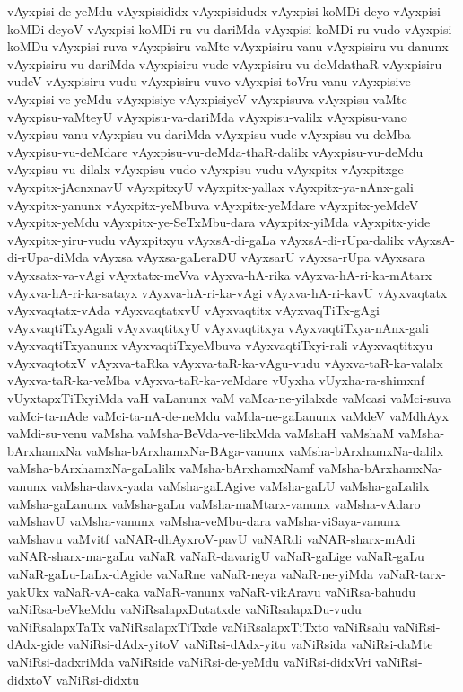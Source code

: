 {vAyxpisi-de-yeMdu
vAyxpisididx
vAyxpisidudx
vAyxpisi-koMDi-deyo
vAyxpisi-koMDi-deyoV
vAyxpisi-koMDi-ru-vu-dariMda
vAyxpisi-koMDi-ru-vudo
vAyxpisi-koMDu
vAyxpisi-ruva
vAyxpisiru-vaMte
vAyxpisiru-vanu
vAyxpisiru-vu-danunx
vAyxpisiru-vu-dariMda
vAyxpisiru-vude
vAyxpisiru-vu-deMdathaR
vAyxpisiru-vudeV
vAyxpisiru-vudu
vAyxpisiru-vuvo
vAyxpisi-toVru-vanu
vAyxpisive
vAyxpisi-ve-yeMdu
vAyxpisiye
vAyxpisiyeV
vAyxpisuva
vAyxpisu-vaMte
vAyxpisu-vaMteyU
vAyxpisu-va-dariMda
vAyxpisu-valilx
vAyxpisu-vano
vAyxpisu-vanu
vAyxpisu-vu-dariMda
vAyxpisu-vude
vAyxpisu-vu-deMba
vAyxpisu-vu-deMdare
vAyxpisu-vu-deMda-thaR-dalilx
vAyxpisu-vu-deMdu
vAyxpisu-vu-dilalx
vAyxpisu-vudo
vAyxpisu-vudu
vAyxpitx
vAyxpitxge
vAyxpitx-jAcnxnavU
vAyxpitxyU
vAyxpitx-yallax
vAyxpitx-ya-nAnx-gali
vAyxpitx-yanunx
vAyxpitx-yeMbuva
vAyxpitx-yeMdare
vAyxpitx-yeMdeV
vAyxpitx-yeMdu
vAyxpitx-ye-SeTxMbu-dara
vAyxpitx-yiMda
vAyxpitx-yide
vAyxpitx-yiru-vudu
vAyxpitxyu
vAyxsA-di-gaLa
vAyxsA-di-rUpa-dalilx
vAyxsA-di-rUpa-diMda
vAyxsa
vAyxsa-gaLeraDU
vAyxsarU
vAyxsa-rUpa
vAyxsara
vAyxsatx-va-vAgi
vAyxtatx-meVva
vAyxva-hA-rika
vAyxva-hA-ri-ka-mAtarx
vAyxva-hA-ri-ka-satayx
vAyxva-hA-ri-ka-vAgi
vAyxva-hA-ri-kavU
vAyxvaqtatx
vAyxvaqtatx-vAda
vAyxvaqtatxvU
vAyxvaqtitx
vAyxvaqTiTx-gAgi
vAyxvaqtiTxyAgali
vAyxvaqtitxyU
vAyxvaqtitxya
vAyxvaqtiTxya-nAnx-gali
vAyxvaqtiTxyanunx
vAyxvaqtiTxyeMbuva
vAyxvaqtiTxyi-rali
vAyxvaqtitxyu
vAyxvaqtotxV
vAyxva-taRka
vAyxva-taR-ka-vAgu-vudu
vAyxva-taR-ka-valalx
vAyxva-taR-ka-veMba
vAyxva-taR-ka-veMdare
vUyxha
vUyxha-ra-shimxnf
vUyxtapxTiTxyiMda
vaH
vaLanunx
vaM
vaMca-ne-yilalxde
vaMcasi
vaMci-suva
vaMci-ta-nAde
vaMci-ta-nA-de-neMdu
vaMda-ne-gaLanunx
vaMdeV
vaMdhAyx
vaMdi-su-venu
vaMsha
vaMsha-BeVda-ve-lilxMda
vaMshaH
vaMshaM
vaMsha-bArxhamxNa
vaMsha-bArxhamxNa-BAga-vanunx
vaMsha-bArxhamxNa-dalilx
vaMsha-bArxhamxNa-gaLalilx
vaMsha-bArxhamxNamf
vaMsha-bArxhamxNa-vanunx
vaMsha-davx-yada
vaMsha-gaLAgive
vaMsha-gaLU
vaMsha-gaLalilx
vaMsha-gaLanunx
vaMsha-gaLu
vaMsha-maMtarx-vanunx
vaMsha-vAdaro
vaMshavU
vaMsha-vanunx
vaMsha-veMbu-dara
vaMsha-viSaya-vanunx
vaMshavu
vaMvitf
vaNAR-dhAyxroV-pavU
vaNARdi
vaNAR-sharx-mAdi
vaNAR-sharx-ma-gaLu
vaNaR
vaNaR-davarigU
vaNaR-gaLige
vaNaR-gaLu
vaNaR-gaLu-LaLx-dAgide
vaNaRne
vaNaR-neya
vaNaR-ne-yiMda
vaNaR-tarx-yakUkx
vaNaR-vA-caka
vaNaR-vanunx
vaNaR-vikAravu
vaNiRsa-bahudu
vaNiRsa-beVkeMdu
vaNiRsalapxDutatxde
vaNiRsalapxDu-vudu
vaNiRsalapxTaTx
vaNiRsalapxTiTxde
vaNiRsalapxTiTxto
vaNiRsalu
vaNiRsi-dAdx-gide
vaNiRsi-dAdx-yitoV
vaNiRsi-dAdx-yitu
vaNiRsida
vaNiRsi-daMte
vaNiRsi-dadxriMda
vaNiRside
vaNiRsi-de-yeMdu
vaNiRsi-didxVri
vaNiRsi-didxtoV
vaNiRsi-didxtu
}
